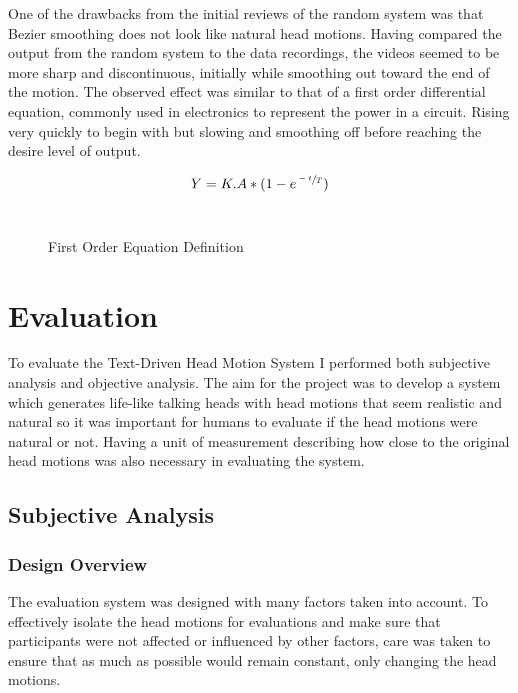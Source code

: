 \documentclass[bsc,frontabs,twoside,singlespacing,parskip]{infthesis}
\begin{document}
One of the drawbacks from the initial reviews of the random system was that Bezier smoothing does not look like natural head motions. Having compared the output from the random system to the data recordings, the videos seemed to be more sharp and discontinuous, initially while smoothing out toward the end of the motion. The observed effect was similar to that of a first order differential equation, commonly used in electronics to represent the power in a circuit. Rising very quickly to begin with but slowing and smoothing off before reaching the desire level of output. 

\begin{figure}
	\centering
	$$ Y = K.A * (1 - e^{\sfrac{-t}{T}})$$
	\\
	
	\caption{First Order Equation Definition} 
\end{figure}

\chapter{Evaluation}

To evaluate the Text-Driven Head Motion System I performed both subjective analysis and objective analysis. The aim for the project was to develop a system which generates life-like talking heads with head motions that seem realistic and natural so it was important for humans to evaluate if the head motions were natural or not. Having a unit of measurement describing how close to the original head motions was also necessary in evaluating the system.

\section{Subjective Analysis}

\subsection{Design Overview}

The evaluation system was designed with many factors taken into account. To effectively isolate the head motions for evaluations and make sure that participants were not affected or influenced by other factors, care was taken to ensure that as much as possible would remain constant, only changing the head motions.
\end{document}
